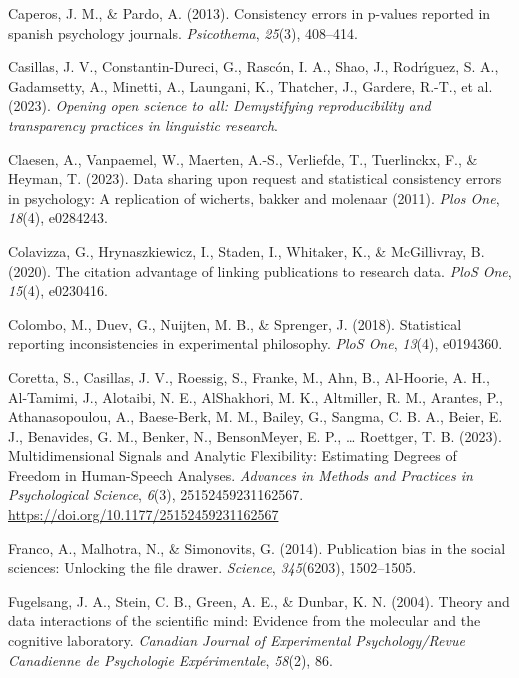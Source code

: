 \documentclass[
  doc,
  longtable,
  nolmodern,
  notxfonts,
  notimes,
  colorlinks=true,linkcolor=blue,citecolor=blue,urlcolor=blue]{apa7}
\newlength{\cslhangindent}
\newenvironment{CSLReferences}[2] %
 {\begin{list}{}{%
  \setlength{\itemindent}{0pt}
  \setlength{\leftmargin}{0pt}
  \setlength{\parsep}{0pt}
  \ifodd #1
   \setlength{\leftmargin}{\cslhangindent}
   \setlength{\itemindent}{-1\cslhangindent}
  \fi
  \setlength{\itemsep}{#2\baselineskip}}}
 {\end{list}}
\begin{document}
\begin{CSLReferences}{1}{0}
Caperos, J. M., \& Pardo, A. (2013). Consistency errors in p-values
reported in spanish psychology journals. \emph{Psicothema},
\emph{25}(3), 408--414.

Casillas, J. V., Constantin-Dureci, G., Rascón, I. A., Shao, J.,
Rodrı́guez, S. A., Gadamsetty, A., Minetti, A., Laungani, K., Thatcher,
J., Gardere, R.-T., et al. (2023). \emph{Opening open science to all:
Demystifying reproducibility and transparency practices in linguistic
research}.

Claesen, A., Vanpaemel, W., Maerten, A.-S., Verliefde, T., Tuerlinckx,
F., \& Heyman, T. (2023). Data sharing upon request and statistical
consistency errors in psychology: A replication of wicherts, bakker and
molenaar (2011). \emph{Plos One}, \emph{18}(4), e0284243.

Colavizza, G., Hrynaszkiewicz, I., Staden, I., Whitaker, K., \&
McGillivray, B. (2020). The citation advantage of linking publications
to research data. \emph{PloS One}, \emph{15}(4), e0230416.

Colombo, M., Duev, G., Nuijten, M. B., \& Sprenger, J. (2018).
Statistical reporting inconsistencies in experimental philosophy.
\emph{PloS One}, \emph{13}(4), e0194360.

Coretta, S., Casillas, J. V., Roessig, S., Franke, M., Ahn, B.,
Al-Hoorie, A. H., Al-Tamimi, J., Alotaibi, N. E., AlShakhori, M. K.,
Altmiller, R. M., Arantes, P., Athanasopoulou, A., Baese-Berk, M. M.,
Bailey, G., Sangma, C. B. A., Beier, E. J., Benavides, G. M., Benker,
N., BensonMeyer, E. P., \ldots{} Roettger, T. B. (2023).
Multidimensional {Signals} and {Analytic} {Flexibility}: {Estimating}
{Degrees} of {Freedom} in {Human}-{Speech} {Analyses}. \emph{Advances in
Methods and Practices in Psychological Science}, \emph{6}(3),
25152459231162567. \url{https://doi.org/10.1177/25152459231162567}

Franco, A., Malhotra, N., \& Simonovits, G. (2014). Publication bias in
the social sciences: Unlocking the file drawer. \emph{Science},
\emph{345}(6203), 1502--1505.

Fugelsang, J. A., Stein, C. B., Green, A. E., \& Dunbar, K. N. (2004).
Theory and data interactions of the scientific mind: Evidence from the
molecular and the cognitive laboratory. \emph{Canadian Journal of
Experimental Psychology/Revue Canadienne de Psychologie
Exp{é}rimentale}, \emph{58}(2), 86.


\end{CSLReferences}
\end{document}
